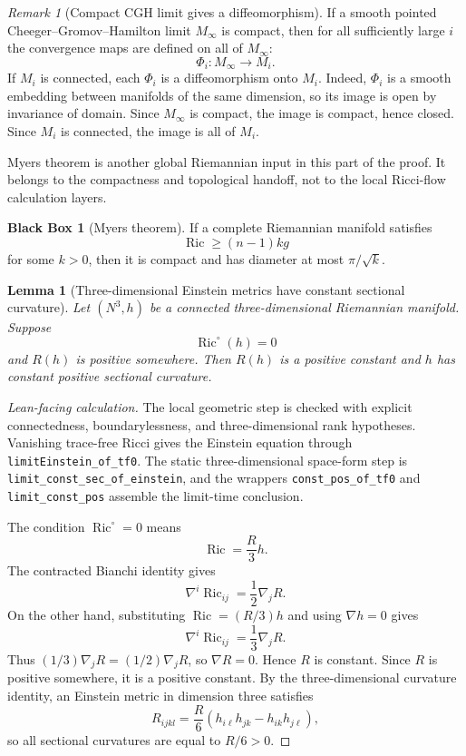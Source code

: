 \documentclass[11pt]{article}
\theoremstyle{plain}
\newtheorem{lemma}[theorem]{Lemma}
\theoremstyle{definition}
\newtheorem{blackbox}[theorem]{Black Box}
\theoremstyle{remark}
\newtheorem{remark}[theorem]{Remark}
\newcommand{\Ric}{\operatorname{Ric}}
\newcommand{\leanref}[1]{\nolinkurl{#1}}
\begin{document}
\begin{remark}[Compact CGH limit gives a diffeomorphism]
\label{rem:compact-cgh-limit-diffeomorphism}
If a smooth pointed Cheeger--Gromov--Hamilton limit $M_\infty$ is compact,
then for all sufficiently large $i$ the convergence maps are defined on all of
$M_\infty$:
\[
\Phi_i:M_\infty\to M_i.
\]
If $M_i$ is connected, each $\Phi_i$ is a diffeomorphism onto $M_i$. Indeed,
$\Phi_i$ is a smooth embedding between manifolds of the same dimension, so its
image is open by invariance of domain.  Since $M_\infty$ is compact, the image
is compact, hence closed.  Since $M_i$ is connected, the image is all of $M_i$.
\end{remark}

Myers theorem is another global Riemannian input in this part of the proof.  It
belongs to the compactness and topological handoff, not to the local Ricci-flow
calculation layers.

\begin{blackbox}[Myers theorem]
\label{bb:myers}
If a complete Riemannian manifold satisfies
\[
\Ric\ge (n-1)kg
\]
for some $k>0$, then it is compact and has diameter at most $\pi/\sqrt{k}$.
\end{blackbox}

\begin{lemma}[Three-dimensional Einstein metrics have constant sectional curvature]
\label{lem:3d-einstein-space-form}
Let $(N^3,h)$ be a connected three-dimensional Riemannian manifold. Suppose
\[
\Ric^\circ(h)=0
\]
and $R(h)$ is positive somewhere. Then $R(h)$ is a positive constant and $h$
has constant positive sectional curvature.
\end{lemma}

\begin{proof}[Lean-facing calculation]
The local geometric step is checked with explicit connectedness,
boundarylessness, and three-dimensional rank hypotheses.  Vanishing trace-free
Ricci gives the Einstein equation through \leanref{limitEinstein_of_tf0}.  The
static three-dimensional space-form step is
\leanref{limit_const_sec_of_einstein}, and the wrappers
\leanref{const_pos_of_tf0} and \leanref{limit_const_pos} assemble the
limit-time conclusion.

The condition \(\Ric^\circ=0\) means
\[
\Ric=\frac R3h.
\]
The contracted Bianchi identity gives
\[
\nabla^i\Ric_{ij}=\frac12\nabla_jR.
\]
On the other hand, substituting \(\Ric=(R/3)h\) and using \(\nabla h=0\) gives
\[
\nabla^i\Ric_{ij}=\frac13\nabla_jR.
\]
Thus \((1/3)\nabla_jR=(1/2)\nabla_jR\), so \(\nabla R=0\).  Hence $R$ is
constant.  Since $R$ is positive somewhere, it is a positive constant.  By the
three-dimensional curvature identity, an Einstein metric in dimension three
satisfies
\[
R_{ijkl}
=
\frac R6
\left(h_{i\ell}h_{jk}-h_{ik}h_{j\ell}\right),
\]
so all sectional curvatures are equal to $R/6>0$.
\end{proof}
\end{document}
